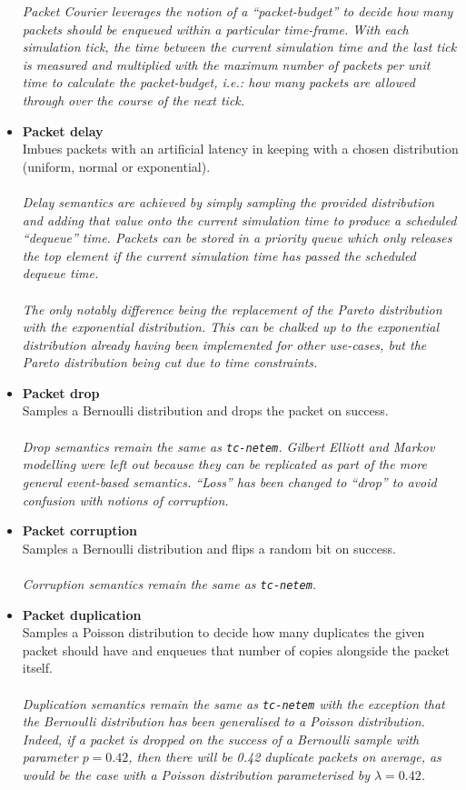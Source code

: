 \begin{itemize}
    \emph{Packet Courier leverages the notion of a ``packet-budget'' to decide how many packets should be enqueued
    within a particular time-frame. With each simulation tick, the time between the current simulation time and the
    last tick is measured and multiplied with the maximum number of packets per unit time to calculate the
    packet-budget, i.e.: how many packets are allowed through over the course of the next tick.}
    \item \textbf{Packet delay} \\
    Imbues packets with an artificial latency in keeping with a chosen distribution (uniform, normal or exponential).
    \\ \\
    \emph{Delay semantics are achieved by simply sampling the provided distribution and adding that value onto the
    current simulation time to produce a scheduled ``dequeue'' time. Packets can be stored in a priority queue which
    only releases the top element if the current simulation time has passed the scheduled dequeue time. \\ \\
    The only notably difference being the replacement of the Pareto distribution with the exponential distribution.
    This can be chalked up to the exponential distribution already having been implemented for other use-cases, but
    the Pareto distribution being cut due to time constraints.}
    \item \textbf{Packet drop} \\
    Samples a Bernoulli distribution and drops the packet on success. \\ \\
    \emph{Drop semantics remain the same as \texttt{tc-netem}. Gilbert Elliott and Markov modelling were left out
    because they can be replicated as part of the more general event-based semantics. ``Loss'' has been changed to
    ``drop'' to avoid confusion with notions of corruption.}
    \item \textbf{Packet corruption} \\
    Samples a Bernoulli distribution and flips a random bit on success.\\ \\
    \emph{Corruption semantics remain the same as \texttt{tc-netem}.}
    \item \textbf{Packet duplication} \\
    Samples a Poisson distribution to decide how many duplicates the given packet should have and enqueues that
    number of copies alongside the packet itself. \\ \\
    \emph{Duplication semantics remain the same as \texttt{tc-netem} with the exception that the Bernoulli distribution
    has been generalised to a Poisson distribution. Indeed, if a packet is dropped on the success of a Bernoulli
    sample with parameter $p = 0.42$, then there will be 0.42 duplicate packets on average, as would be the case with
    a Poisson distribution parameterised by $\lambda = 0.42$.}
\end{itemize}

